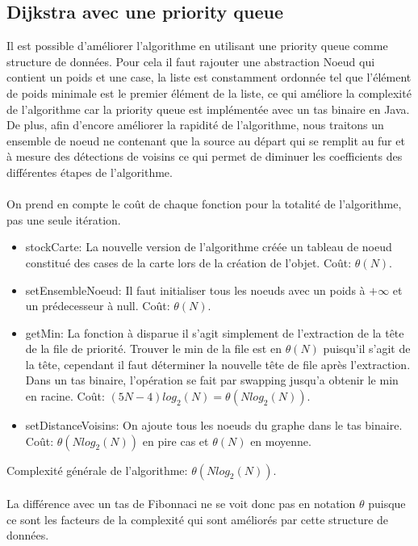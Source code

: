 \documentclass[12pt,a4paper]{article}
\begin{document}
\subsection{Dijkstra avec une priority queue}
Il est possible d'améliorer l'algorithme en utilisant une priority queue comme structure de données. Pour cela il faut rajouter une abstraction Noeud qui contient un poids et une case, la liste est constamment ordonnée tel que l'élément de poids minimale est le premier élément de la liste, ce qui améliore la complexité de l'algorithme car la priority queue est implémentée avec un tas binaire en Java.\\
De plus, afin d'encore améliorer la rapidité de l'algorithme, nous traitons un ensemble de noeud ne contenant que la source au départ qui se remplit au fur et à mesure des détections de voisins ce qui permet de diminuer les coefficients des différentes étapes de l'algorithme.\\\\
On prend en compte le coût de chaque fonction pour la totalité de l'algorithme, pas une seule itération.
\begin{itemize}
	\item stockCarte: La nouvelle version de l'algorithme créée un tableau de noeud constitué des cases de la carte lors de la création de l'objet. Coût: $\theta(N)$.
	\item setEnsembleNoeud: Il faut initialiser tous les noeuds avec un poids à $+\infty$ et un prédecesseur à null. Coût: $\theta(N)$.
	\item getMin: La fonction à disparue il s'agit simplement de l'extraction de la tête de la file de priorité. Trouver le min de la file est en $\theta(N)$ puisqu'il s'agit de la tête, cependant il faut déterminer la nouvelle tête de file après l'extraction. Dans un tas binaire, l'opération se fait par swapping jusqu'a obtenir le min en racine. Coût: $(5N-4)log_2(N)=\theta(Nlog_2(N))$.
	\item setDistanceVoisins: On ajoute tous les noeuds du graphe dans le tas binaire. Coût: $\theta(Nlog_2(N))$ en pire cas et $\theta(N)$ en moyenne.\\
\end{itemize}
Complexité générale de l'algorithme: $\theta(Nlog_2(N))$.\\\\
La différence avec un tas de Fibonnaci ne se voit donc pas en notation $\theta$ puisque ce sont les facteurs de la complexité qui sont améliorés par cette structure de données.
\end{document}
